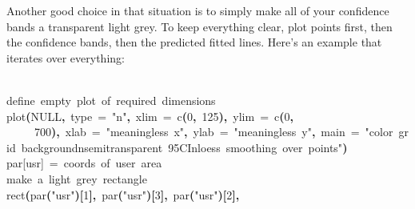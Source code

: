 \documentclass[a4paper]{article}
\newcommand{\hlnumber}[1]{\textcolor[rgb]{0.0823529411764706,0.0784313725490196,0.709803921568627}{#1}}%
\newcommand{\hlfunctioncall}[1]{\textcolor[rgb]{1,0,0}{#1}}%
\newcommand{\hlstring}[1]{\textcolor[rgb]{0.6,0.6,1}{#1}}%
\newcommand{\hlkeyword}[1]{\textcolor[rgb]{0,0,0}{\textbf{#1}}}%
\newcommand{\hlargument}[1]{\textcolor[rgb]{0.694117647058824,0.247058823529412,0.0196078431372549}{#1}}%
\newcommand{\hlcomment}[1]{\textcolor[rgb]{0.8,0.8,0.8}{#1}}%
\newcommand{\hlprompt}[1]{\textcolor[rgb]{0,0,0}{#1}}%
\newcommand{\hlstd}[1]{\textcolor[rgb]{0,0,0}{#1}}%
\newenvironment{Houtput}{\raggedright}{%
%
}
\begin{document}
Another good choice in that situation is to simply make all of your confidence bands a transparent light grey. To keep everything clear, plot points first, then the confidence bands, then the predicted fitted lines. Here's an example that iterates over everything:

\begin{Houtput}
\hspace*{\fill}\\
\hlstd{}\ttfamily\noindent
\hlprompt{\usebox{\hlnormalsizeboxgreaterthan}{\ }}\hlcomment{\usebox{\hlnormalsizeboxhash}{\ }define{\ }empty{\ }plot{\ }of{\ }required{\ }dimensions}\mbox{}
\normalfont
\hspace*{\fill}\\
\hlstd{}\ttfamily\noindent
\hlprompt{\usebox{\hlnormalsizeboxgreaterthan}{\ }}\hlfunctioncall{plot}\hlkeyword{(}NULL\hlkeyword{,}{\ }\hlargument{type}{\ }\hlargument{=}{\ }\hlstring{"n"}\hlkeyword{,}{\ }\hlargument{xlim}{\ }\hlargument{=}{\ }\hlfunctioncall{c}\hlkeyword{(}\hlnumber{0}\hlkeyword{,}{\ }\hlnumber{125}\hlkeyword{)}\hlkeyword{,}{\ }\hlargument{ylim}{\ }\hlargument{=}{\ }\hlfunctioncall{c}\hlkeyword{(}\hlnumber{0}\hlkeyword{,}\hspace*{\fill}\\
\hlstd{}\hlprompt{{\ }}{\ }{\ }{\ }{\ }\hlnumber{700}\hlkeyword{)}\hlkeyword{,}{\ }\hlargument{xlab}{\ }\hlargument{=}{\ }\hlstring{"meaningless{\ }x"}\hlkeyword{,}{\ }\hlargument{ylab}{\ }\hlargument{=}{\ }\hlstring{"meaningless{\ }y"}\hlkeyword{,}{\ }\hlargument{main}{\ }\hlargument{=}{\ }\hlstring{"color{\ }grid{\ }background\usebox{\hlnormalsizeboxbackslash}nsemitransparent{\ }95\usebox{\hlnormalsizeboxpercent}{\ }CI\usebox{\hlnormalsizeboxbackslash}nloess{\ }smoothing{\ }over{\ }points"}\hlkeyword{)}\mbox{}
\normalfont
\hspace*{\fill}\\
\hlstd{}\ttfamily\noindent
\hlprompt{\usebox{\hlnormalsizeboxgreaterthan}{\ }}\hlcomment{\usebox{\hlnormalsizeboxhash}{\ }par[\usebox{\hlnormalsizeboxsinglequote}usr\usebox{\hlnormalsizeboxsinglequote}]{\ }={\ }coords{\ }of{\ }user{\ }area}\mbox{}
\normalfont
\hspace*{\fill}\\
\hlstd{}\ttfamily\noindent
\hlprompt{\usebox{\hlnormalsizeboxgreaterthan}{\ }}\hlcomment{\usebox{\hlnormalsizeboxhash}{\ }make{\ }a{\ }light{\ }grey{\ }rectangle}\mbox{}
\normalfont
\hspace*{\fill}\\
\hlstd{}\ttfamily\noindent
\hlprompt{\usebox{\hlnormalsizeboxgreaterthan}{\ }}\hlfunctioncall{rect}\hlkeyword{(}\hlfunctioncall{par}\hlkeyword{(}\hlstring{"usr"}\hlkeyword{)}\hlkeyword{[}\hlnumber{1}\hlkeyword{]}\hlkeyword{,}{\ }\hlfunctioncall{par}\hlkeyword{(}\hlstring{"usr"}\hlkeyword{)}\hlkeyword{[}\hlnumber{3}\hlkeyword{]}\hlkeyword{,}{\ }\hlfunctioncall{par}\hlkeyword{(}\hlstring{"usr"}\hlkeyword{)}\hlkeyword{[}\hlnumber{2}\hlkeyword{]}\hlkeyword{,}\hspace*{\fill}\\

\end{Houtput}
\end{document}
